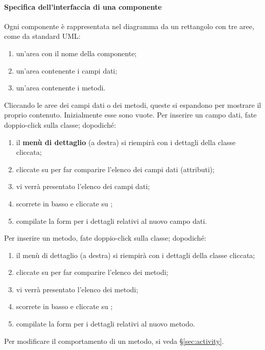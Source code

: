 \paragraph{Specifica dell'interfaccia di una componente} \label{par:inter} Ogni componente è rappresentata nel diagramma da un rettangolo con tre aree, come da standard UML:
\begin{enumerate}
	\item un'area con il nome della componente;
	\item un'area contenente i campi dati;
	\item un'area contenente i metodi.
\end{enumerate}
Cliccando le aree dei campi dati o dei metodi, queste si espandono per mostrare il proprio contenuto. Inizialmente esse sono vuote. Per inserire un campo dati, fate doppio-click sulla classe; dopodiché:
\begin{enumerate}
	\item il \textbf{menù di dettaglio} (a destra) si riempirà con i dettagli della classe cliccata;
	\item cliccate su  per far comparire l'elenco dei campi dati (attributi);
	\item vi verrà presentato l'elenco dei campi dati;
	\item scorrete in basso e cliccate su ;
	\item compilate la form per i dettagli relativi al nuovo campo dati.
\end{enumerate}
Per inserire un metodo, fate doppio-click sulla classe; dopodiché:
\begin{enumerate}
	\item il menù di dettaglio (a destra) si riempirà con i dettagli della classe cliccata;
	\item cliccate su  per far comparire l'elenco dei metodi;
	\item vi verrà presentato l'elenco dei metodi;
	\item scorrete in basso e cliccate su ;
	\item compilate la form per i dettagli relativi al nuovo metodo.
\end{enumerate}
Per modificare il comportamento di un metodo, si veda §\ref{sec:activity}.

